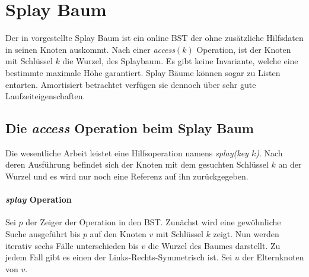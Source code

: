 \documentclass[a4paper,12pt]{article}
\begin{document}
\section{Splay Baum}
Der in \cite{splay} vorgestellte Splay Baum ist ein online BST der ohne zusätzliche Hilfsdaten in seinen Knoten auskommt. Nach einer \textit{access}$\left(k\right)$ Operation, ist der Knoten mit Schlüssel $k$ die Wurzel, des Splaybaum. Es gibt keine Invariante, welche eine bestimmte maximale Höhe garantiert. Splay Bäume können sogar zu Listen entarten. Amortisiert betrachtet verfügen sie dennoch über sehr gute Laufzeiteigenschaften. 


\subsection{Die \textit{access} Operation beim Splay Baum }
Die wesentliche Arbeit leistet eine Hilfsoperation namens \textit{splay(key $k$)}. Nach deren Ausführung befindet sich der Knoten mit dem gesuchten Schlüssel $k$ an der Wurzel und es wird nur noch eine Referenz auf ihn zurückgegeben.

\paragraph{\textit{splay} Operation}
Sei $p$ der Zeiger der Operation in den BST. Zunächst wird eine gewöhnliche Suche ausgeführt bis $p$ auf den Knoten $v$ mit Schlüssel $k$ zeigt. Nun werden iterativ sechs Fälle unterschieden bis $v$ die Wurzel des Baumes darstellt. Zu jedem Fall gibt es einen der Links-Rechts-Symmetrisch ist. Sei $u$ der Elternknoten von $v$. 
\end{document}
